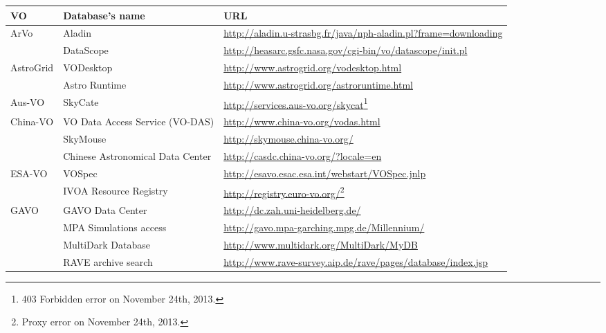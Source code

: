 \begin{center}
\begin{longtable}{|m{2cm}|m{4.5cm}|m{7.5cm}|}
    \hline
    \textbf{VO} & \textbf{Database's name} & \textbf{URL} \\
    \hline
    \multirow{2}{*}{ArVo} & Aladin
    & \url{http://aladin.u-strasbg.fr/java/nph-aladin.pl?frame=downloading} \\
    \cline{2-3}
     & DataScope
     & \url{http://heasarc.gsfc.nasa.gov/cgi-bin/vo/datascope/init.pl} \\
     \hline
    \multirow{2}{*}{AstroGrid} & VODesktop
    & \url{http://www.astrogrid.org/vodesktop.html}\\
    \cline{2-3}
     & Astro Runtime & \url{http://www.astrogrid.org/astroruntime.html} \\
     \hline
    Aus-VO & SkyCate
    & \url{http://services.aus-vo.org/skycat}\footnote{403 Forbidden error on 
                                                       November 24th, 2013.} \\ 
    \hline
    \multirow{3}{*}{China-VO} & VO Data Access Service (VO-DAS)
    & \url{http://www.china-vo.org/vodas.html} \\
    \cline{2-3}
     & SkyMouse & \url{http://skymouse.china-vo.org/} \\
     \cline{2-3}
     & Chinese Astronomical Data Center 
     & \url{http://casdc.china-vo.org/?locale=en} \\
     \hline
    \multirow{2}{*}{ESA-VO} & VOSpec
    & \url{http://esavo.esac.esa.int/webstart/VOSpec.jnlp} \\
     \cline{2-3}
     & IVOA Resource Registry
     & \url{http://registry.euro-vo.org/}\footnote{Proxy error on November 24th,
                                                   2013.} \\
     \hline
    \multirow{5}{*}{GAVO} & GAVO Data Center
    & \url{http://dc.zah.uni-heidelberg.de/} \\
    \cline{2-3}
     & MPA Simulations access
     & \url{http://gavo.mpa-garching.mpg.de/Millennium/} \\
     \cline{2-3}
     & MultiDark Database
     & \url{http://www.multidark.org/MultiDark/MyDB} \\
     \cline{2-3}
     & RAVE archive search
     & \url{http://www.rave-survey.aip.de/rave/pages/database/index.jsp} \\

\end{longtable}
\end{center}
